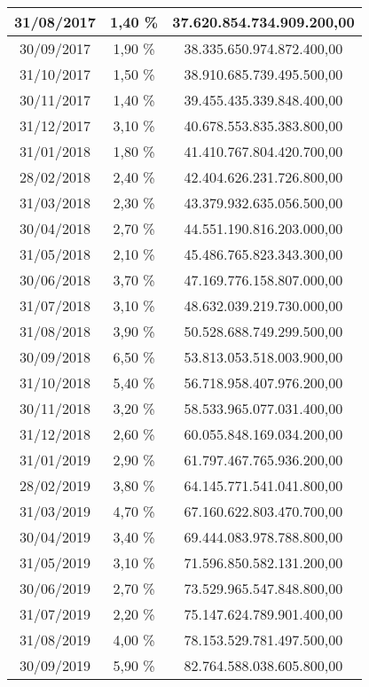 \begin{center}
\begin{longtable}{|c|c|c|}
31/08/2017 & 1,40 \% & 37.620.854.734.909.200,00  \\ \hline
30/09/2017 & 1,90 \% & 38.335.650.974.872.400,00  \\ \hline
31/10/2017 & 1,50 \% & 38.910.685.739.495.500,00  \\ \hline
30/11/2017 & 1,40 \% & 39.455.435.339.848.400,00  \\ \hline
31/12/2017 & 3,10 \% & 40.678.553.835.383.800,00  \\ \hline
31/01/2018 & 1,80 \% & 41.410.767.804.420.700,00  \\ \hline
28/02/2018 & 2,40 \% & 42.404.626.231.726.800,00  \\ \hline
31/03/2018 & 2,30 \% & 43.379.932.635.056.500,00  \\ \hline
30/04/2018 & 2,70 \% & 44.551.190.816.203.000,00  \\ \hline
31/05/2018 & 2,10 \% & 45.486.765.823.343.300,00  \\ \hline
30/06/2018 & 3,70 \% & 47.169.776.158.807.000,00  \\ \hline
31/07/2018 & 3,10 \% & 48.632.039.219.730.000,00  \\ \hline
31/08/2018 & 3,90 \% & 50.528.688.749.299.500,00  \\ \hline
30/09/2018 & 6,50 \% & 53.813.053.518.003.900,00  \\ \hline
31/10/2018 & 5,40 \% & 56.718.958.407.976.200,00  \\ \hline
30/11/2018 & 3,20 \% & 58.533.965.077.031.400,00  \\ \hline
31/12/2018 & 2,60 \% & 60.055.848.169.034.200,00  \\ \hline
31/01/2019 & 2,90 \% & 61.797.467.765.936.200,00  \\ \hline
28/02/2019 & 3,80 \% & 64.145.771.541.041.800,00  \\ \hline
31/03/2019 & 4,70 \% & 67.160.622.803.470.700,00  \\ \hline
30/04/2019 & 3,40 \% & 69.444.083.978.788.800,00  \\ \hline
31/05/2019 & 3,10 \% & 71.596.850.582.131.200,00  \\ \hline
30/06/2019 & 2,70 \% & 73.529.965.547.848.800,00  \\ \hline
31/07/2019 & 2,20 \% & 75.147.624.789.901.400,00  \\ \hline
31/08/2019 & 4,00 \% & 78.153.529.781.497.500,00  \\ \hline
30/09/2019 & 5,90 \% & 82.764.588.038.605.800,00  \\ \hline

\end{longtable}
\end{center}
